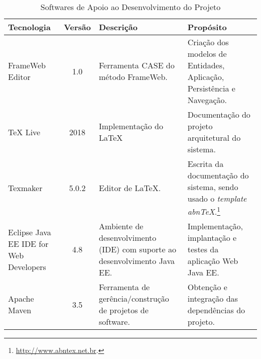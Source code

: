 \begin{table}[h]
	\centering	
	\vspace{0.5cm}
	\caption{Softwares de Apoio ao Desenvolvimento do Projeto}	
	\label{tabela-software}
	\begin{tabular}{|p{3cm}|c|p{5cm}|p{6cm}|}  \hline 
	
 		Tecnologia & Versão & Descrição & Propósito \\\hline 
 		 
		FrameWeb Editor & 1.0 & Ferramenta CASE do método FrameWeb. & Criação dos modelos de Entidades, Aplicação, Persistência e Navegação. \\\hline

		TeX Live  & 2018 & Implementação do \LaTeX & Documentação do projeto arquitetural do sistema. \\\hline       
		
		Texmaker & 5.0.2 & Editor de LaTeX. &  Escrita da documentação do sistema, sendo usado o \textit{template} \textit{abnTeX}.\footnote{\url{http://www.abntex.net.br}.} \\\hline    

		Eclipse Java EE IDE for Web Developers & 4.8 & Ambiente de desenvolvimento (IDE) com suporte ao desenvolvimento Java EE. & Implementação, implantação e testes da aplicação Web Java EE. \\\hline 
		
		Apache Maven & 3.5 & Ferramenta de gerência/construção de projetos de software. & Obtenção e integração das dependências do projeto. \\\hline
	\end{tabular}
\end{table}

